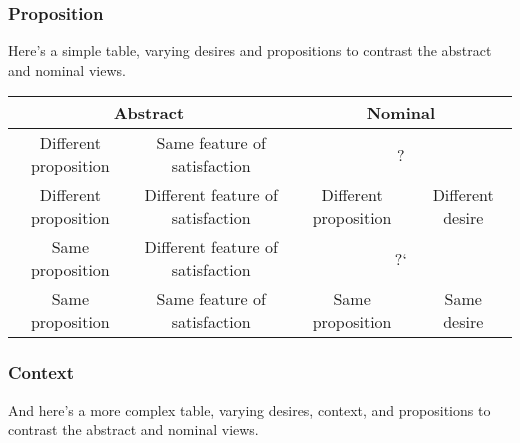 \documentclass[10pt]{article}
\begin{document}

\subsubsection{Proposition}
\label{sec:prop}

Here's a simple table, varying desires and propositions to contrast the abstract and nominal views.

\begin{center}
  {\setlength{\tabcolsep}{0.5em}%
      \renewcommand{\arraystretch}{1.5}%
    \begin{tabular}[h]{cc|cc}
      \multicolumn{2}{c}{Abstract} & \multicolumn{2}{c}{Nominal} \\
      \hline
      Different proposition & Same feature of satisfaction & \multicolumn{2}{c}{?} \\
      Different proposition & Different feature of satisfaction & Different proposition & Different desire \\
      Same proposition & Different feature of satisfaction & \multicolumn{2}{c}{?`} \\  %
      Same proposition & Same feature of satisfaction & Same proposition & Same desire \\
    \end{tabular}
}
\end{center}


\subsubsection{Context}
\label{sec:context}

And here's a more complex table, varying desires, context, and propositions to contrast the abstract and nominal views.


\end{document}
